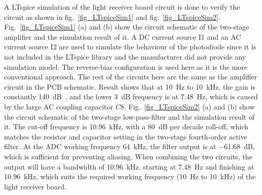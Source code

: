 A LTspice simulation of the light receiver board circuit is done to verify the circuit as shown in fig.~\ref{fig_LTspiceSim1} and fig.~\ref{fig_LTspiceSim2}.  Fig.~\ref{fig_LTspiceSim1} (a) and (b) show the circuit schematic of the two-stage amplifier and the simulation result of it.  A DC current source I1 and an AC current source I2 are used to simulate the behaviour of the photodiode since it is not included in the LTspice library and the manufacturer did not provide any simulation model.  The reverse-bias configuration is used here as it is the more conventional approach.  The rest of the circuits here are the same as the amplifier circuit in the PCB schematic.  Result shows that at \qty{10}{Hz} to \qty{10}{kHz}, the gain is constantly \qty{140}{dB\Omega}, and the lower \qty{3}{dB} frequency is at \qty{7.48}{Hz}, which is caused by the large AC coupling capacitor $C8$.  Fig.~\ref{fig_LTspiceSim2} (a) and (b) show the circuit schematic of the two-stage low-pass-filter and the simulation result of it.  The cut-off frequency is \qty{10.96}{kHz}, with a \qty{80}{dB} per decade roll-off, which matches the resistor and capacitor setting in the two-stage fourth-order active filter.  At the ADC working frequency \qty{64}{kHz}, the filter output is at \qty{-61.68}{dB}, which is sufficient for preventing aliasing.  When combining the two circuits, the output will have a bandwidth of \qty{10.96}{kHz}, starting at \qty{7.48}{Hz} and finishing at \qty{10.96}{kHz}, which suits the required working frequency (\qty{10}{Hz} to \qty{10}{kHz}) of the light receiver board.

